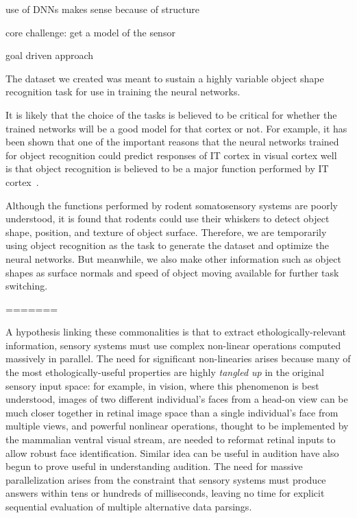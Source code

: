 

use of DNNs makes sense because of structure

core challenge: get a model of the sensor

goal driven approach


The dataset we created was meant to sustain a highly variable object shape recognition task for use in training the neural networks.  

It is likely that the choice of the tasks is believed to be critical for whether the trained networks will be a good model for that cortex or not.
For example, it has been shown that one of the important reasons that the neural networks trained for object recognition could predict responses of IT cortex in visual cortex well~\cite{Yamins2014, cadieu2014deep} is that object recognition is believed to be a major function performed by IT cortex~\cite{hung2005fast, yamins2016using}. 

Although the functions performed by rodent somatosensory systems are poorly understood, it is found that rodents could use their whiskers to detect object shape, position, and texture of object surface\cite{Boubenec2012,Diamond2008,Arabzadeh2005,OConnor2010}.
Therefore, we are temporarily using object recognition as the task to generate the dataset and optimize the neural networks. But meanwhile, we also make other information such as object shapes as surface normals and speed of object moving available for further task switching.



=======


A hypothesis linking these commonalities is that to extract ethologically-relevant information, sensory systems must use complex non-linear operations computed massively in parallel.  The need for significant non-linearies arises because many of the most ethologically-useful properties are highly \emph{tangled up} in the original sensory input space: for example, in vision, where this phenomenon is best understood, images of two different individual's faces from a head-on view can be much closer together in retinal image space than a single individual's face from multiple views, and powerful nonlinear operations, thought to be implemented by the mammalian ventral visual stream, are needed to reformat retinal inputs to allow robust face identification\cite{}.  Similar idea can be useful in audition have also begun to prove useful in understanding audition\cite{}. The need for massive parallelization arises from the constraint that sensory systems must produce answers within tens or hundreds of milliseconds, leaving no time for explicit sequential evaluation of multiple alternative data parsings.   




